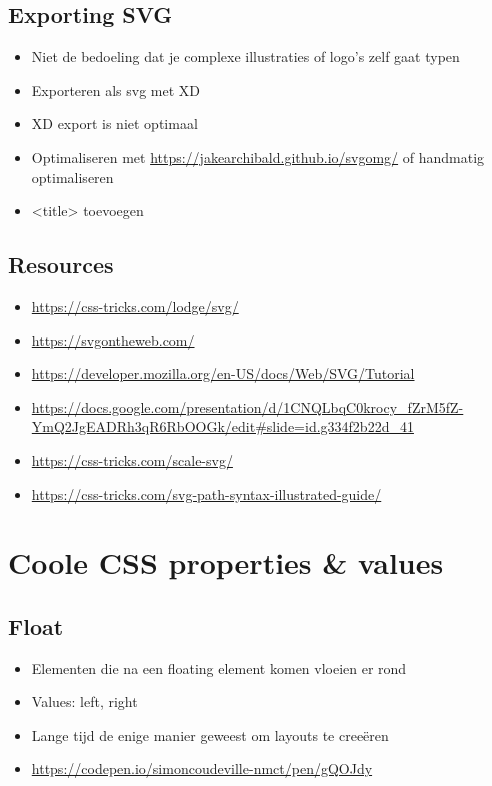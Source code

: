 \documentclass{article}
\begin{document}
\subsection{Exporting SVG}
\begin{itemize}
    \item Niet de bedoeling dat je complexe illustraties of logo’s zelf gaat typen
    \item Exporteren als svg met XD
    \item XD export is niet optimaal
    \item Optimaliseren met \url{https://jakearchibald.github.io/svgomg/} of handmatig optimaliseren
    \item <title> toevoegen
\end{itemize}

\subsection{Resources}
\begin{itemize}
\item \url{https://css-tricks.com/lodge/svg/}
\item \url{https://svgontheweb.com/}
\item \url{https://developer.mozilla.org/en-US/docs/Web/SVG/Tutorial}
\item \url{https://docs.google.com/presentation/d/1CNQLbqC0krocy_fZrM5fZ-YmQ2JgEADRh3qR6RbOOGk/edit#slide=id.g334f2b22d_41}
\item \url{https://css-tricks.com/scale-svg/}
\item \url{https://css-tricks.com/svg-path-syntax-illustrated-guide/}
\end{itemize}

\section{Coole CSS properties \& values}

\subsection{Float}
\begin{itemize}
    \item Elementen die na een floating element komen vloeien er rond
    \item Values: left, right
    \item Lange tijd de enige manier geweest om layouts te creeëren
    \item \url{https://codepen.io/simoncoudeville-nmct/pen/gQOJdy}
\end{itemize}
\end{document}

